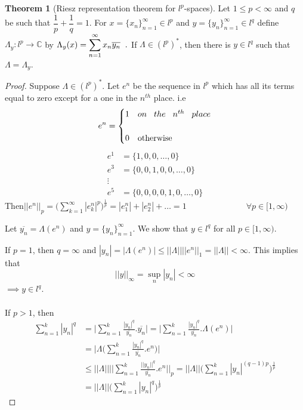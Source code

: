 \documentclass[11pt,a4paper]{article}
\theoremstyle{definition}
\newtheorem{thm}{Theorem}[section]
\begin{document}
\begin{thm}[Riesz representation theorem for $l^p$-spaces]
Let $1\leq p<\infty$ and $q$ be such that $\dfrac{1}{p}+\dfrac{1}{q}=1$.  For $x=\{x_n\}^{\infty}_{n=1}\in l^p$ and $y=\{y_n\}^{\infty}_{n=1}\in l^q$ define $\Lambda_y:l^p\rightarrow \mathbb{C}$ by \hspace{0.2cm}$\displaystyle{\Lambda_y(x)=\sum^{\infty}_{n=1}x_n\overline{y_n}}\hspace{0.2cm}.$ If $\Lambda \in (l^p)^*$, then there is $y\in l^q$ such that $\Lambda =\Lambda_y$.

\end{thm}


\begin{proof}
Suppose $\Lambda \in (l^p)^*$. Let $e^n$ be the sequence in $l^p$ which has all its terms equal to zero except for a one in the $n^{th}$ place.\hspace{0.3cm} i.e
\[ e^n=
\begin{cases}
1  &{on\hspace{0.3cm} the\hspace{0.3cm} n^{th}\hspace{0.3cm} place}\\\\
0 &\text{otherwise}
\end{cases}
\]
\begin{align*}
e^1 &=\{1,0,0,\dots,0\}\\
e^3 &=\{0,0,1,0,0,\dots,0\}\\
\vdots\\
e^5 &=\{0,0,0,0,1,0,\dots,0\}
\end{align*}
Then\hspace{0.3cm}$\displaystyle{
||e^n||_p =\Bigg(\sum_{k=1}^{\infty}|e^n_k|^p\Bigg)^{\frac{1}{p}}
          =|e^n_1|+|e^n_2|+\dots
          =1\hspace{3cm} \forall p\in [1,\infty)}$

Let $\overline{y_n}=\Lambda (e^n)$ and $y=\{y_n\}^{\infty}_{n=1}$. We show that $y\in l^q$ for all $p\in[1,\infty)$.

If $p=1$, then $q=\infty$ and \hspace{0.2cm}$|y_n|=|\Lambda(e^n)|\leq ||\Lambda||||e^n||_1=||\Lambda||<\infty.$ This implies that $$||y||_{\infty}=\sup_{n}|y_n|<\infty$$ $\implies y\in l^q$.\\\\
If $p>1$, then
\begin{align*}
\sum^{k}_{n=1}|y_n|^q &=\Bigg|\sum^k_{n=1}\frac{|y_n|^q}{\overline{y_n}}.\overline{y_n}\Bigg|
                       =\Bigg|\sum^k_{n=1}\frac{|y_n|^q}{\overline{y_n}}.\Lambda(e^n)\Bigg|\\
                      &=\Bigg|\Lambda \Bigg(\sum^k_{n=1}\frac{|y_n|^q}{\overline{y_n}}.e^n\Bigg)\Bigg|\\   
                      &\leq ||\Lambda||\Bigg|\Bigg|\sum^k_{n=1}\frac{||y_n||^q}{\overline{y_n}}.e^n\Bigg|\Bigg|_p
                       =||\Lambda||\Bigg(\sum^k_{n=1}|y_n|^{(q-1)p}\Bigg)^{\frac{1}{p}}\\
                      &=||\Lambda||\Bigg(\sum^k_{n=1}|y_n|^q\Bigg)^{\frac{1}{p}}
\end{align*}


\end{proof}
\end{document}
